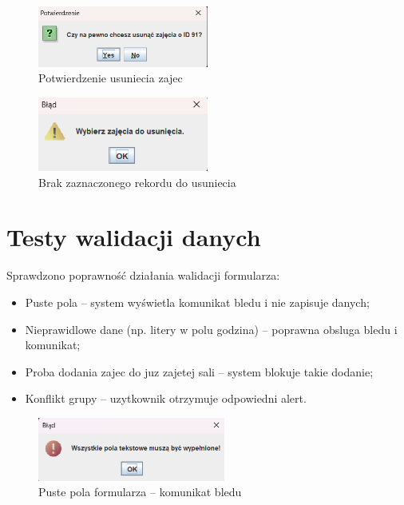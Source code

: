 \begin{figure}[H]
\centering
\includegraphics[width=0.5\textwidth]{figures/Warning/delete_warning.png}
\caption{Potwierdzenie usuniecia zajec}
\end{figure}

\begin{figure}[H]
\centering
\includegraphics[width=0.5\textwidth]{figures/Warning/select_zajecia.png}
\caption{Brak zaznaczonego rekordu do usuniecia}
\end{figure}

\section{Testy walidacji danych}

Sprawdzono poprawność działania walidacji formularza:

\begin{itemize}
    \item Puste pola – system wyświetla komunikat bledu i nie zapisuje danych;
    \item Nieprawidlowe dane (np. litery w polu godzina) – poprawna obsluga bledu i komunikat;
    \item Proba dodania zajec do juz zajetej sali – system blokuje takie dodanie;
    \item Konflikt grupy – uzytkownik otrzymuje odpowiedni alert.
\end{itemize}

\begin{figure}[H]
\centering
\includegraphics[width=0.55\textwidth]{figures/Errors/add_panel_error.png}
\caption{Puste pola formularza – komunikat bledu}
\end{figure}

